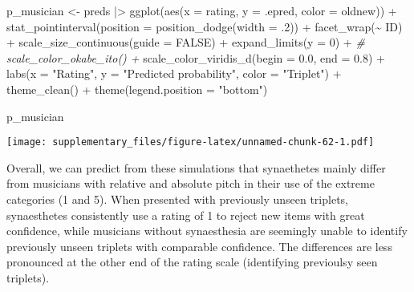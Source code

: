 \documentclass[
  man,floatsintext]{apa7}
\newenvironment{Shaded}{\begin{snugshade}}{\end{snugshade}}
\newcommand{\AttributeTok}[1]{\textcolor[rgb]{0.77,0.63,0.00}{#1}}
\newcommand{\CommentTok}[1]{\textcolor[rgb]{0.56,0.35,0.01}{\textit{#1}}}
\newcommand{\ConstantTok}[1]{\textcolor[rgb]{0.00,0.00,0.00}{#1}}
\newcommand{\DecValTok}[1]{\textcolor[rgb]{0.00,0.00,0.81}{#1}}
\newcommand{\FloatTok}[1]{\textcolor[rgb]{0.00,0.00,0.81}{#1}}
\newcommand{\FunctionTok}[1]{\textcolor[rgb]{0.00,0.00,0.00}{#1}}
\newcommand{\NormalTok}[1]{#1}
\newcommand{\OtherTok}[1]{\textcolor[rgb]{0.56,0.35,0.01}{#1}}
\newcommand{\SpecialCharTok}[1]{\textcolor[rgb]{0.00,0.00,0.00}{#1}}
\newcommand{\StringTok}[1]{\textcolor[rgb]{0.31,0.60,0.02}{#1}}
\begin{document}
\begin{Shaded}
\begin{Highlighting}[]
\NormalTok{p\_musician }\OtherTok{\textless{}{-}}\NormalTok{ preds }\SpecialCharTok{|\textgreater{}} 
  \FunctionTok{ggplot}\NormalTok{(}\FunctionTok{aes}\NormalTok{(}\AttributeTok{x =}\NormalTok{ rating, }\AttributeTok{y =}\NormalTok{ .epred, }\AttributeTok{color =}\NormalTok{ oldnew)) }\SpecialCharTok{+}
  \FunctionTok{stat\_pointinterval}\NormalTok{(}\AttributeTok{position =} \FunctionTok{position\_dodge}\NormalTok{(}\AttributeTok{width =}\NormalTok{ .}\DecValTok{2}\NormalTok{)) }\SpecialCharTok{+}
  \FunctionTok{facet\_wrap}\NormalTok{(}\SpecialCharTok{\textasciitilde{}}\NormalTok{ ID) }\SpecialCharTok{+}
  \FunctionTok{scale\_size\_continuous}\NormalTok{(}\AttributeTok{guide =} \ConstantTok{FALSE}\NormalTok{) }\SpecialCharTok{+}
  \FunctionTok{expand\_limits}\NormalTok{(}\AttributeTok{y =} \DecValTok{0}\NormalTok{) }\SpecialCharTok{+}
  \CommentTok{\# scale\_color\_okabe\_ito() +}
  \FunctionTok{scale\_color\_viridis\_d}\NormalTok{(}\AttributeTok{begin =} \FloatTok{0.0}\NormalTok{, }\AttributeTok{end =} \FloatTok{0.8}\NormalTok{) }\SpecialCharTok{+}
  \FunctionTok{labs}\NormalTok{(}\AttributeTok{x =} \StringTok{"Rating"}\NormalTok{, }\AttributeTok{y =} \StringTok{"Predicted probability"}\NormalTok{, }\AttributeTok{color =} \StringTok{"Triplet"}\NormalTok{) }\SpecialCharTok{+}
  \FunctionTok{theme\_clean}\NormalTok{() }\SpecialCharTok{+}
  \FunctionTok{theme}\NormalTok{(}\AttributeTok{legend.position =} \StringTok{"bottom"}\NormalTok{)}
\end{Highlighting}
\end{Shaded}

\begin{Shaded}
\begin{Highlighting}[]
\NormalTok{p\_musician}
\end{Highlighting}
\end{Shaded}

\texttt{[image: supplementary\_files/figure-latex/unnamed-chunk-62-1.pdf]}

Overall, we can predict from these simulations that synaethetes mainly differ from musicians with relative and absolute pitch in their use of the extreme categories (1 and 5). When presented with previously unseen triplets, synaesthetes consistently use a rating of 1 to reject new items with great confidence, while musicians without synaesthesia are seemingly unable to identify previously unseen triplets with comparable confidence. The differences are less pronounced at the other end of the rating scale (identifying previoulsy seen triplets).
\end{document}
